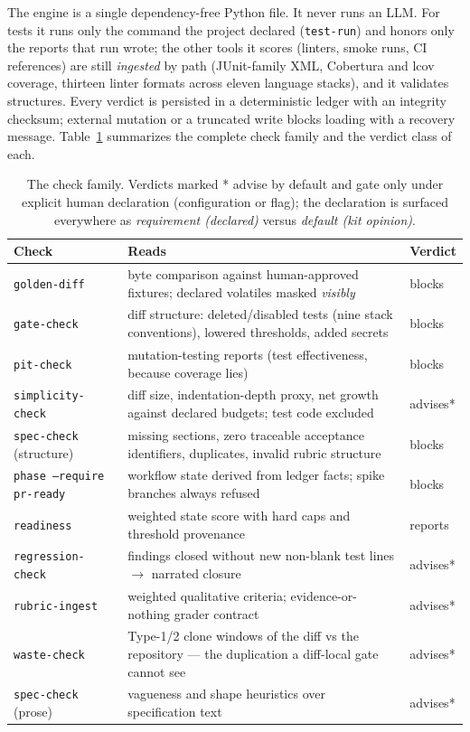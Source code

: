 \documentclass[11pt]{article}
\begin{document}
The engine is a single dependency-free Python file. It never runs an LLM. For
tests it runs only the command the project declared (\texttt{test-run}) and
honors only the reports that run wrote; the other tools it scores (linters,
smoke runs, CI references) are still \emph{ingested} by path (JUnit-family XML,
Cobertura and lcov coverage, thirteen linter formats across eleven language
stacks), and it validates structures. Every verdict is persisted in a
deterministic ledger with an integrity checksum; external mutation or a
truncated write blocks loading with a recovery message.
Table~\ref{tab:checks} summarizes the complete check family and the verdict
class of each.

\begin{table}[t]
\centering
\small
\begin{tabular}{@{}lp{8.6cm}l@{}}
\toprule
\textbf{Check} & \textbf{Reads} & \textbf{Verdict} \\
\midrule
\texttt{golden-diff} & byte comparison against human-approved fixtures;
declared volatiles masked \emph{visibly} & blocks \\
\texttt{gate-check} & diff structure: deleted/disabled tests (nine stack
conventions), lowered thresholds, added secrets & blocks \\
\texttt{pit-check} & mutation-testing reports (test effectiveness, because
coverage lies) & blocks \\
\texttt{simplicity-check} & diff size, indentation-depth proxy, net growth against
declared budgets; test code excluded & advises* \\
\texttt{spec-check} (structure) & missing sections, zero traceable acceptance
identifiers, duplicates, invalid rubric structure & blocks \\
\texttt{phase --require pr-ready} & workflow state derived from ledger facts;
spike branches always refused & blocks \\
\texttt{readiness} & weighted state score with hard caps and threshold
provenance & reports \\
\texttt{regression-check} & findings closed without new non-blank test lines
$\rightarrow$ narrated closure & advises* \\
\texttt{rubric-ingest} & weighted qualitative criteria; evidence-or-nothing
grader contract & advises* \\
\texttt{waste-check} & Type-1/2 clone windows of the diff vs the repository ---
the duplication a diff-local gate cannot see & advises* \\
\texttt{spec-check} (prose) & vagueness and shape heuristics over
specification text & advises* \\
\bottomrule
\end{tabular}
\caption{The check family. Verdicts marked * advise by default and gate only
under explicit human declaration (configuration or flag); the declaration is
surfaced everywhere as \emph{requirement (declared)} versus \emph{default (kit
opinion)}.}
\label{tab:checks}
\end{table}
\end{document}
